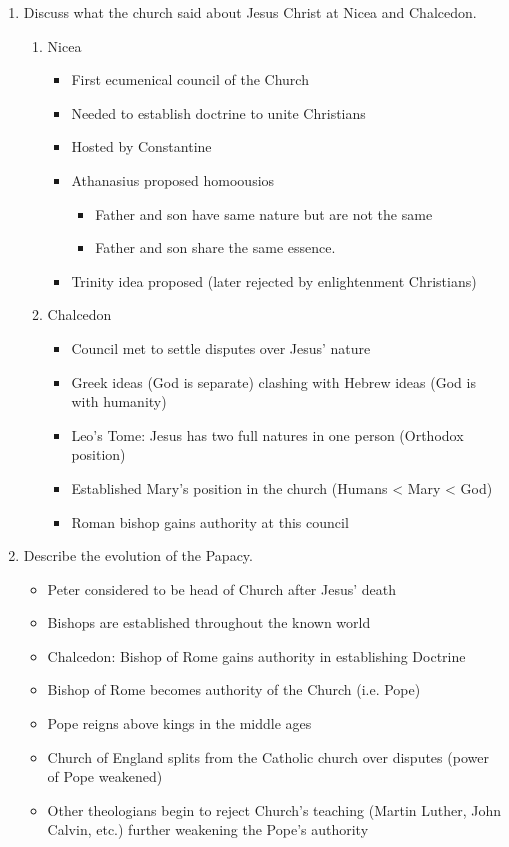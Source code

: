 \documentclass[8pt]{article}
\begin{document}
\begin{enumerate}
    \item Discuss what the church said about Jesus Christ at Nicea and Chalcedon.
    \begin{enumerate}
        \item Nicea
        \begin{itemize}
            \item First ecumenical council of the Church
            \item Needed to establish doctrine to unite Christians
            \item Hosted by Constantine
            \item Athanasius proposed homoousios
            \begin{itemize}
                \item Father and son have same nature but are not the same
                \item Father and son share the same essence.
            \end{itemize}
            \item Trinity idea proposed (later rejected by enlightenment Christians)
        \end{itemize}
        \item Chalcedon
        \begin{itemize}
            \item Council met to settle disputes over Jesus' nature
            \item Greek ideas (God is separate) clashing with Hebrew ideas (God is with humanity)
            \item Leo's Tome: Jesus has two full natures in one person (Orthodox position)
            \item Established Mary's position in the church (Humans < Mary < God)
            \item Roman bishop gains authority at this council
        \end{itemize}
    \end{enumerate}

    \item Describe the evolution of the Papacy.
    \begin{itemize}
        \item Peter considered to be head of Church after Jesus' death
        \item Bishops are established throughout the known world
        \item Chalcedon: Bishop of Rome gains authority in establishing Doctrine
        \item Bishop of Rome becomes authority of the Church (i.e. Pope)
        \item Pope reigns above kings in the middle ages
        \item Church of England splits from the Catholic church over disputes (power of Pope weakened)
        \item Other theologians begin to reject Church's teaching (Martin Luther, John Calvin, etc.) further weakening the Pope's authority
    \end{itemize}


\end{enumerate}
\end{document}
